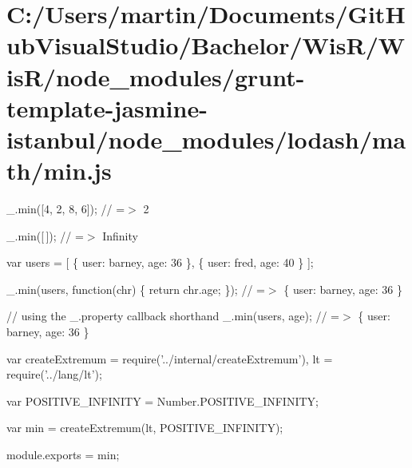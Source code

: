 \hypertarget{_c_1_2_users_2martin_2_documents_2_git_hub_visual_studio_2_bachelor_2_wis_r_2_wis_r_2node_moduleca3fd70f9fe52483b11104f94aabcca0}{}\section{C\+:/\+Users/martin/\+Documents/\+Git\+Hub\+Visual\+Studio/\+Bachelor/\+Wis\+R/\+Wis\+R/node\+\_\+modules/grunt-\/template-\/jasmine-\/istanbul/node\+\_\+modules/lodash/math/min.\+js}
\+\_\+.\+min(\mbox{[}4, 2, 8, 6\mbox{]}); // =$>$ 2

\+\_\+.\+min(\mbox{[}$\,$\mbox{]}); // =$>$ Infinity

var users = \mbox{[} \{ \textquotesingle{}user\textquotesingle{}\+: \textquotesingle{}barney\textquotesingle{}, \textquotesingle{}age\textquotesingle{}\+: 36 \}, \{ \textquotesingle{}user\textquotesingle{}\+: \textquotesingle{}fred\textquotesingle{}, \textquotesingle{}age\textquotesingle{}\+: 40 \} \mbox{]};

\+\_\+.\+min(users, function(chr) \{ return chr.\+age; \}); // =$>$ \{ \textquotesingle{}user\textquotesingle{}\+: \textquotesingle{}barney\textquotesingle{}, \textquotesingle{}age\textquotesingle{}\+: 36 \}

// using the {\ttfamily \+\_\+.\+property} callback shorthand \+\_\+.\+min(users, \textquotesingle{}age\textquotesingle{}); // =$>$ \{ \textquotesingle{}user\textquotesingle{}\+: \textquotesingle{}barney\textquotesingle{}, \textquotesingle{}age\textquotesingle{}\+: 36 \}


\begin{DoxyCodeInclude}
var createExtremum = require(\textcolor{stringliteral}{'../internal/createExtremum'}),
    lt = require(\textcolor{stringliteral}{'../lang/lt'});

var POSITIVE\_INFINITY = Number.POSITIVE\_INFINITY;

var min = createExtremum(lt, POSITIVE\_INFINITY);

module.exports = min;
\end{DoxyCodeInclude}
 